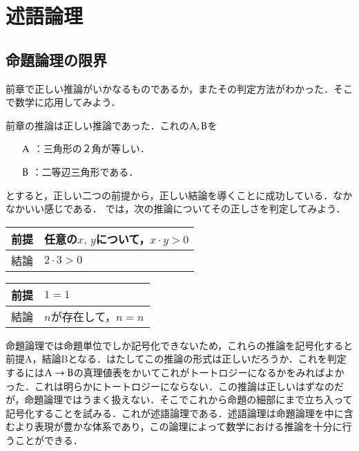 \documentclass[10pt,b5paper,papersize,dvipdfmx]{jsbook}
\begin{document}
\section{述語論理}
\subsection{命題論理の限界}
前章で正しい推論がいかなるものであるか，またその判定方法がわかった．そこで数学に応用してみよう．\par
前章の推論は正しい推論であった．これの$\mathrm{A}, \mathrm{B}$を
\begin{itemize}
  \item[$\mathrm{A}$]：三角形の２角が等しい．
  \item[$\mathrm{B}$]：二等辺三角形である．
\end{itemize}
とすると，正しい二つの前提から，正しい結論を導くことに成功している．なかなかいい感じである．
では，次の推論についてその正しさを判定してみよう．
\begin{table}[H]
  \begin{tabular}{ll}
    前提 & 任意の$x,\, y$について，$x \cdot y>0$ \\ \hline
    結論 & $2 \cdot 3 > 0$\\
  \end{tabular}
\end{table}
\begin{table}[H]
  \begin{tabular}{ll}
    前提 & $1 = 1$ \\ \hline
    結論 & $n$が存在して，$n = n$\\
  \end{tabular}
\end{table}
命題論理では命題単位でしか記号化できないため，これらの推論を記号化すると前提A，結論Bとなる．はたしてこの推論の形式は正しいだろうか．これを判定するには$\rmA\to\rmB$の真理値表をかいてこれがトートロジーになるかをみればよかった．これは明らかにトートロジーにならない．この推論は正しいはずなのだが，命題論理ではうまく扱えない．そこでこれから命題の細部にまで立ち入って記号化することを試みる．これが述語論理である．述語論理は命題論理を中に含むより表現が豊かな体系であり，この論理によって数学における推論を十分に行うことができる．
\end{document}
